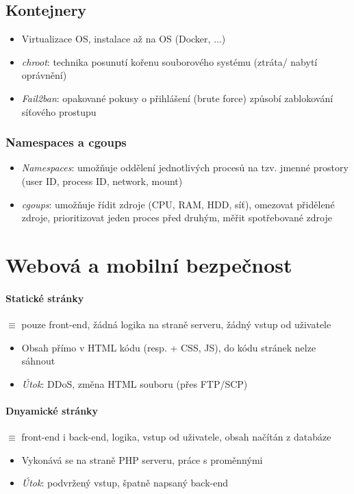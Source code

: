 \documentclass[10pt,a4paper]{article}
\begin{document}
\subsection{Kontejnery}
\begin{itemize}
    \item Virtualizace OS, instalace až na OS (Docker, ...)
    \item \textit{chroot}: technika posunutí kořenu souborového systému (ztráta/ nabytí oprávnění)
    \item \textit{Fail2ban}:  opakované pokusy o přihlášení (brute force) způsobí zablokování síťového prostupu
\end{itemize}

\subsubsection*{Namespaces a cgoups}
\begin{itemize}
    \item \textit{Namespaces}: umožňuje oddělení jednotlivých procesů na tzv. jmenné prostory (user ID, process ID, network, mount)
    \item \textit{cgoups}: umožňuje řídit zdroje (CPU, RAM, HDD, síť), omezovat přidělené zdroje, prioritizovat jeden proces před druhým, měřit spotřebované zdroje
\end{itemize}



\section{Webová a mobilní bezpečnost}

\paragraph*{Statické stránky} $\equiv$ pouze front-end, žádná logika na straně serveru, žádný vstup od uživatele
\begin{itemize}
    \item Obsah přímo v HTML kódu (resp. + CSS, JS), do kódu stránek nelze sáhnout
    \item \textit{Útok}: DDoS, změna HTML souboru (přes FTP/SCP)
\end{itemize}

\paragraph*{Dnyamické stránky} $\equiv$ front-end i back-end, logika, vstup od uživatele, obsah načítán z databáze
\begin{itemize}
    \item Vykonává se na straně PHP serveru, práce s proměnnými
    \item \textit{Útok}: podvržený vstup, špatně napsaný back-end
\end{itemize}
\end{document}
